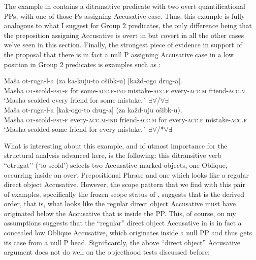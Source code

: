 \documentclass[output=paper,colorlinks,citecolor=brown,modfonts,nonflat]{langsci/langscibook}
\begin{document}
The example in  contains a ditransitive predicate with two overt quantificational PPs, with one of those Ps assigning Accusative case. Thus, this example is fully analogous to what I suggest for Group 2 predicates, the only difference being that the preposition assigning Accusative is overt in  but covert in all the other cases we’ve seen in this section. Finally, the strongest piece of evidence in support of the proposal that there is in fact a null P assigning Accusative case in a low position in Group 2 predicates is examples such as :

\ea%
    \label{ex:antonyuk:54}
    \ea \label{ex:antonyuk:54a}
    \gll    Maša ot-ruga-l-a (za ka-kuju-to ošibk-u) [každ-ogo drug-a].\\
            Masha \textsc{ot-}scold\textsc{-pst-f} for some\textsc{-acc.f-ind} mistake\textsc{-acc.f} \hspaceThis{[}every\textsc{-acc.m} friend\textsc{-acc.m}\\
    \glt    `Masha scolded every friend for some mistake.´ 
            \hfill ${\exists}{\forall}$/${\forall}{\exists}$\\
    \ex \label{ex:antonyuk:54b}
    \gll    Maša ot-ruga-l-a [kak-ogo-to drug-a] (za každ-uju ošibk-u).\\
            Masha \textsc{ot-}scold\textsc{-pst-f} \hspaceThis{[}every\textsc{-acc.m-ind} friend\textsc{-acc.m} for every\textsc{-acc.f} mistake\textsc{-acc.f}\\
    \glt    `Masha scolded some friend for every mistake.´ 
            \hfill ${\exists}{\forall}$/*${\forall}{\exists}$
    \z
\z

What is interesting about this example, and of utmost importance for the structural analysis advanced here, is the following: this ditransitive verb “otrugat’’ (‘to scold’) selects two Accusative-marked objects, one Oblique, occurring inside an overt Prepositional Phrase and one which looks like a regular direct object Accusative. However, the scope pattern that we find with this pair of examples, specifically the frozen scope status of , suggests that  is the {derived} order, that is, what looks like the regular direct object Accusative must have originated below the Accusative that is inside the PP. This, of course, on my assumptions suggests that the “regular” direct object Accusative in  is in fact a concealed low Oblique Accusative, which originates inside a null PP and thus gets its case from a null P head. Significantly, the above “direct object” Accusative argument does not do well on the objecthood tests discussed before:
\end{document}
